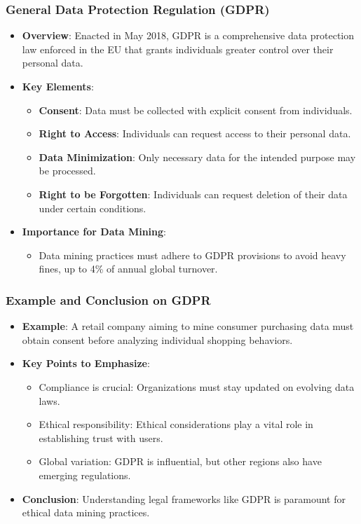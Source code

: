 \documentclass{beamer}
\begin{document}
\begin{frame}[fragile]
    \frametitle{General Data Protection Regulation (GDPR)}
    \begin{itemize}
        \item \textbf{Overview}: Enacted in May 2018, GDPR is a comprehensive data protection law enforced in the EU that grants individuals greater control over their personal data.
        
        \item \textbf{Key Elements}:
        \begin{itemize}
            \item \textbf{Consent}: Data must be collected with explicit consent from individuals.
            \item \textbf{Right to Access}: Individuals can request access to their personal data.
            \item \textbf{Data Minimization}: Only necessary data for the intended purpose may be processed.
            \item \textbf{Right to be Forgotten}: Individuals can request deletion of their data under certain conditions.
        \end{itemize}

        \item \textbf{Importance for Data Mining}:
        \begin{itemize}
            \item Data mining practices must adhere to GDPR provisions to avoid heavy fines, up to 4\% of annual global turnover.
        \end{itemize}
    \end{itemize}
\end{frame}

\begin{frame}[fragile]
    \frametitle{Example and Conclusion on GDPR}
    \begin{itemize}
        \item \textbf{Example}: A retail company aiming to mine consumer purchasing data must obtain consent before analyzing individual shopping behaviors.
        
        \item \textbf{Key Points to Emphasize}:
        \begin{itemize}
            \item Compliance is crucial: Organizations must stay updated on evolving data laws.
            \item Ethical responsibility: Ethical considerations play a vital role in establishing trust with users.
            \item Global variation: GDPR is influential, but other regions also have emerging regulations.
        \end{itemize}

        \item \textbf{Conclusion}: Understanding legal frameworks like GDPR is paramount for ethical data mining practices.
    \end{itemize}
\end{frame}
\end{document}
